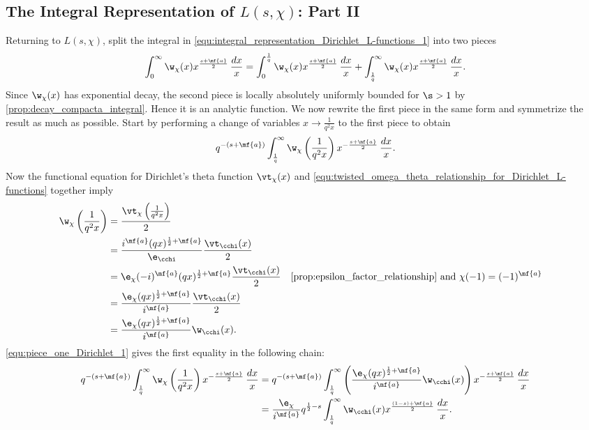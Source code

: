     \subsection*{The Integral Representation of \texorpdfstring{$L(s,\chi)$}{L(s,\chi)}: Part II}
      Returning to $L(s,\chi)$, split the integral in \cref{equ:integral_representation_Dirichlet_L-functions_1} into two pieces
      \begin{equation}\label{equ:symmetric_integral_Dirichlet_L-functions_split}
        \int_{0}^{\infty}\w_{\chi}(x)x^{\frac{s+\mf{a}}{2}}\,\frac{dx}{x} = \int_{0}^{\frac{1}{q}}\w_{\chi}(x)x^{\frac{s+\mf{a}}{2}}\,\frac{dx}{x}+\int_{\frac{1}{q}}^{\infty}\w_{\chi}(x)x^{\frac{s+\mf{a}}{2}}\,\frac{dx}{x}.
      \end{equation}
      Since $\w_{\chi}(x)$ has exponential decay, the second piece is locally absolutely uniformly bounded for $\s > 1$ by \cref{prop:decay_compacta_integral}. Hence it is an analytic function. We now rewrite the first piece in the same form and symmetrize the result as much as possible. Start by performing a change of variables $x \to \frac{1}{q^{2}x}$ to the first piece to obtain
      \[
        q^{-(s+\mf{a})}\int_{\frac{1}{q}}^{\infty}\w_{\chi}\left(\frac{1}{q^{2}x}\right)x^{-\frac{s+\mf{a}}{2}}\,\frac{dx}{x}.
      \]
      Now the functional equation for Dirichlet's theta function $\vt_{\chi}(x)$ and \cref{equ:twisted_omega_theta_relationship_for_Dirichlet_L-functions} together imply
      \begin{equation}\label{equ:piece_one_Dirichlet_1}
        \begin{aligned}
          \w_{\chi}\left(\frac{1}{q^{2}x}\right) &= \frac{\vt_{\chi}\left(\frac{1}{q^{2}x}\right)}{2} \\
          &= \frac{i^{\mf{a}}(qx)^{\frac{1}{2}+\mf{a}}}{\e_{\cchi}}\frac{\vt_{\cchi}(x)}{2} \\
          &= \e_{\chi}(-i)^{\mf{a}}(qx)^{\frac{1}{2}+\mf{a}}\frac{\vt_{\cchi}(x)}{2} && \text{\cref{prop:epsilon_factor_relationship} and $\chi(-1) = (-1)^{\mf{a}}$} \\
          &= \frac{\e_{\chi}(qx)^{\frac{1}{2}+\mf{a}}}{i^{\mf{a}}}\frac{\vt_{\cchi}(x)}{2} \\
          &= \frac{\e_{\chi}(qx)^{\frac{1}{2}+\mf{a}}}{i^{\mf{a}}}\w_{\cchi}(x).
        \end{aligned}
      \end{equation}
      \cref{equ:piece_one_Dirichlet_1} gives the first equality in the following chain:
      \begin{align*}
        q^{-(s+\mf{a})}\int_{\frac{1}{q}}^{\infty}\w_{\chi}\left(\frac{1}{q^{2}x}\right)x^{-\frac{s+\mf{a}}{2}}\,\frac{dx}{x} &= q^{-(s+\mf{a})}\int_{\frac{1}{q}}^{\infty}\left(\frac{\e_{\chi}(qx)^{\frac{1}{2}+\mf{a}}}{i^{\mf{a}}}\w_{\cchi}(x)\right)x^{-\frac{s+\mf{a}}{2}}\,\frac{dx}{x} \\
        &= \frac{\e_{\chi}}{i^{\mf{a}}}q^{\frac{1}{2}-s}\int_{\frac{1}{q}}^{\infty}\w_{\cchi}(x)x^{\frac{(1-s)+\mf{a}}{2}}\,\frac{dx}{x}.
      \end{align*}

